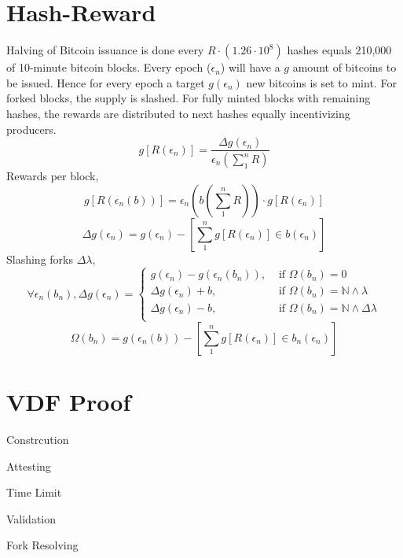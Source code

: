 \documentclass[a4paper,10pt]{article}
\begin{document}
\section{Hash-Reward}
Halving of Bitcoin issuance is done every $R \cdot (1.26 \cdot 10^8)$ hashes equals 210,000 of 10-minute bitcoin blocks. Every epoch ($\epsilon_n$) will have a $g$ amount of bitcoins to be issued. Hence for every epoch a target $g(\epsilon_n)$ new bitcoins is set to mint. For forked blocks, the supply is slashed. For fully minted blocks with remaining hashes, the rewards are distributed to next hashes equally incentivizing producers.
\begin{equation*}
g[R(\epsilon_n)] = \frac{\Delta g(\epsilon_n)}{\epsilon_n(\sum_1^n R)}
\end{equation*}
Rewards per block,
\begin{equation*}
g[R(\epsilon_n(b))] = \epsilon_n(b(\sum_1^n R)) \cdot g[R(\epsilon_n)]
\end{equation*}
\begin{equation*}
\Delta g(\epsilon_n) = g(\epsilon_n) - [\sum_1^n g[R(\epsilon_n)]  \in b(\epsilon_n)]
\end{equation*}
Slashing forks $\Delta \lambda$,
\begin{equation*}
\forall \epsilon_n(b_n), \Delta g(\epsilon_n) = 
\begin{cases}
g(\epsilon_n) - g(\epsilon_n(b_n)), & \text{ if } \Omega(b_n) =  0 \\
\Delta g(\epsilon_n) + b, & \text{ if } \Omega(b_n) = \mathbb{N} \wedge \lambda  \\
\Delta g(\epsilon_n) - b, & \text{ if } \Omega(b_n) =  \mathbb{N} \wedge \Delta \lambda \\
\end{cases}
\end{equation*}
\begin{equation*}
\Omega(b_n) = g(\epsilon_n(b)) - [\sum_1^n g[R(\epsilon_n)]  \in b_n(\epsilon_n)]
\end{equation*}
\section{VDF Proof}
Constrcution

Attesting

Time Limit

Validation

Fork Resolving
\end{document}
